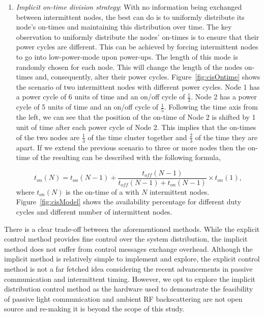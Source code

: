 \begin{enumerate}[label=\roman*.]
		\item \textit{Implicit on-time division strategy}: With no information being exchanged between intermittent nodes, the best \sys can do is to uniformly distribute its node's on-times and maintaining this distribution over time. The key observation to uniformly distribute the nodes' on-times is to ensure that their power cycles are different. This can be achieved by forcing intermittent nodes to go into low-power-mode upon power-ups. The length of this mode is randomly chosen for each node. This will change the length of the nodes on-times and, consequently, alter their power cycles. Figure~\ref{fig:cisOntime} shows the scenario of two intermittent nodes with different power cycles. Node 1 has a power cycle of 6 units of time and an on/off cycle of $\frac{1}{3}$. Node 2 has a power cycle of 5 units of time and an on/off cycle of $\frac{1}{5}$. Following the time axis from the left, we can see that the position of the on-time of Node 2 is shifted by 1 unit of time after each power cycle of Node 2. This implies that the on-times of the two nodes are $\frac{1}{3}$ of the time cluster together and $\frac{2}{3}$ of the time they are apart. If we extend the previous scenario to three or more nodes then the on-time of the resulting \sys can be described with the following formula,
				
\begin{equation}
	t_{on}(N) = t_{on}(N-1) + \frac{t_{off}(N-1)}{t_{off}(N-1)+t_{on}(N-1)} \times t_{on}(1),
		\label{eq:cisModel}
\end{equation}
where $t_{on}(N)$ is the on-time of a \sys with $N$ intermittent nodes. Figure~\ref{fig:cisModel} shows the \sys availability percentage for different duty cycles and different number of intermittent nodes.
\end{enumerate}
There is a clear trade-off between the aforementioned methods. While the explicit control method provides fine control over the system distribution, the implicit method does not suffer from control messages exchange overhead. Although the implicit method is relatively simple to implement and explore, the explicit control method is not a far fetched idea considering the recent advancements in passive communication and intermittent timing. However, we opt to explore the implicit distribution control method as the hardware used to demonstrate the feasibility of passive light communication and ambient RF backscattering are not open source and re-making it is beyond the scope of this study.

